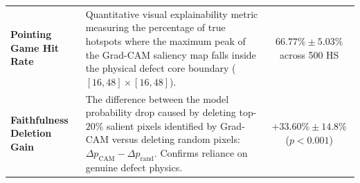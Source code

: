 \documentclass[11pt,journal,onecolumn]{IEEEtran}
\begin{document}
\begin{table}[htbp]
\begin{tabular}{p{4.2cm}p{9.8cm}c}
\addlinespace
\textbf{Pointing Game Hit Rate} & Quantitative visual explainability metric measuring the percentage of true hotspots where the maximum peak of the Grad-CAM saliency map falls inside the physical defect core boundary ($[16, 48] \times [16, 48]$). & $66.77\% \pm 5.03\%$ across 500 HS \\
\addlinespace
\textbf{Faithfulness Deletion Gain} & The difference between the model probability drop caused by deleting top-$20\%$ salient pixels identified by Grad-CAM versus deleting random pixels: $\Delta p_{\text{CAM}} - \Delta p_{\text{rand}}$. Confirms reliance on genuine defect physics. & $+33.60\% \pm 14.8\%$ ($p < 0.001$) \\
\bottomrule
\end{tabular}
\end{table}
\end{document}
